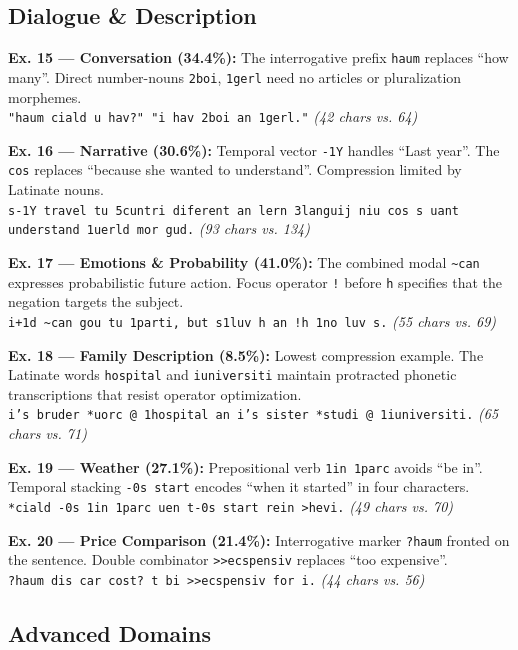 \documentclass[10pt,twocolumn,letterpaper]{article}
\newcommand{\me}[1]{\texttt{#1}}
\begin{document}
\subsection{Dialogue \& Description}

\textbf{Ex. 15 --- Conversation (34.4\%):} The interrogative prefix \me{haum} replaces ``how many''. Direct number-nouns \me{2boi}, \me{1gerl} need no articles or pluralization morphemes.\\
\me{"haum ciald u hav?" "i hav 2boi an 1gerl."} \textit{(42 chars vs. 64)}

\textbf{Ex. 16 --- Narrative (30.6\%):} Temporal vector \me{-1Y} handles ``Last year''. The \me{cos} replaces ``because she wanted to understand''. Compression limited by Latinate nouns.\\
\me{s-1Y travel tu 5cuntri diferent an lern 3languij niu cos s uant understand 1uerld mor gud.} \textit{(93 chars vs. 134)}

\textbf{Ex. 17 --- Emotions \& Probability (41.0\%):} The combined modal \me{\~{}can} expresses probabilistic future action. Focus operator \me{!} before \me{h} specifies that the negation targets the subject.\\
\me{i+1d \~{}can gou tu 1parti, but s1luv h an !h 1no luv s.} \textit{(55 chars vs. 69)}

\textbf{Ex. 18 --- Family Description (8.5\%):} Lowest compression example. The Latinate words \me{hospital} and \me{iuniversiti} maintain protracted phonetic transcriptions that resist operator optimization.\\
\me{i's bruder *uorc @ 1hospital an i's sister *studi @ 1iuniversiti.} \textit{(65 chars vs. 71)}

\textbf{Ex. 19 --- Weather (27.1\%):} Prepositional verb \me{1in 1parc} avoids ``be in''. Temporal stacking \me{-0s start} encodes ``when it started'' in four characters.\\
\me{*ciald -0s 1in 1parc uen t-0s start rein >hevi.} \textit{(49 chars vs. 70)}

\textbf{Ex. 20 --- Price Comparison (21.4\%):} Interrogative marker \me{?haum} fronted on the sentence. Double combinator \me{>>ecspensiv} replaces ``too expensive''.\\
\me{?haum dis car cost? t bi >>ecspensiv for i.} \textit{(44 chars vs. 56)}

\subsection{Advanced Domains}
\end{document}
